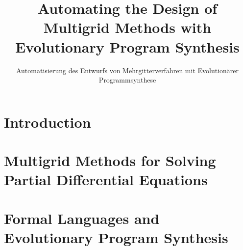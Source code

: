 \documentclass[
  paper = 17x24,
  language = english,
  acronym = split,
  acronymline = novertical,
  bibliography = combined,
  bibliographypart = all,
  titlesize = Huge,
  par = halfskip,
]{faupress}
\title{Automating the Design of Multigrid Methods with Evolutionary Program Synthesis}
\subtitle{Automatisierung des Entwurfs von Mehrgitterverfahren mit Evolutionärer Programmsynthese}
\institute{Lehrstuhl für Informatik 10}
\theoremstyle{definition}
\numberwithin{equation}{chapter}
\begin{document}

\frontmatter
  
  \makefacultytitle

  \begin{abstract}
    
  \end{abstract}
  \begin{zusammenfassung}
    
  \end{zusammenfassung}

  \tableofcontents

  
  

\mainmatter

\chapter{Introduction}


\chapter{Multigrid Methods for Solving Partial Differential Equations}
  
  
  
\chapter{Formal Languages and Evolutionary Program Synthesis}
\label{chapter:formal-languages-and-gp}
  
  
\end{document}

